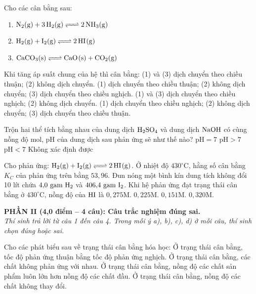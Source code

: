 \documentclass[12pt,a4paper]{article}
\begin{document}
\begin{ex}
Cho các cân bằng sau:
\begin{enumerate}[(1)]
	\item $\ce{N2(g) + 3H2(g) <=> 2NH3(g)}$
	\item $\ce{H2(g) + I2(g) <=> 2HI(g)}$
	\item $\ce{CaCO3(s) <=> CaO(s) + CO2(g)}$
\end{enumerate}
Khi tăng áp suất chung của hệ thì cân bằng:
\choice
{(1) và (3) dịch chuyển theo chiều thuận; (2) không dịch chuyển.}
{(1) dịch chuyển theo chiều thuận; (2) không dịch chuyển; (3) dịch chuyển theo chiều nghịch.}
{(1) và (3) dịch chuyển theo chiều nghịch; (2) không dịch chuyển.}
{(1) dịch chuyển theo chiều nghịch; (2) không dịch chuyển; (3) dịch chuyển theo chiều thuận.}
\loigiai{}
\end{ex}

\begin{ex}
Trộn hai thể tích bằng nhau của dung dịch $\ce{H2SO4}$ và dung dịch $\ce{NaOH}$ có cùng nồng độ mol, pH của dung dịch sau phản ứng sẽ như thế nào?
\choice
{$\text{pH} = 7$}
{$\text{pH} > 7$}
{$\text{pH} < 7$}
{Không xác định được}
\loigiai{}
\end{ex}

\begin{ex}
Cho phản ứng: $\ce{H2(g) + I2(g) <=> 2HI(g)}$. Ở nhiệt độ $430^\circ\text{C}$, hằng số cân bằng $K_C$ của phản ứng trên bằng $53{,}96$. Đun nóng một bình kín dung tích không đổi 10 lít chứa $4{,}0\text{ gam } \ce{H2}$ và $406{,}4\text{ gam } \ce{I2}$. Khi hệ phản ứng đạt trạng thái cân bằng ở $430^\circ\text{C}$, nồng độ của $\ce{HI}$ là
\choice
{$0{,}275\text{M}.$}
{$0{,}225\text{M}.$}
{$0{,}151\text{M}.$}
{$0{,}320\text{M}.$}
\loigiai{}
\end{ex}


\bigskip
\noindent
\textbf{PHẦN II (4,0 điểm -- 4 câu): Câu trắc nghiệm đúng sai.}\\
\textit{Thí sinh trả lời từ câu 1 đến câu 4. Trong mỗi ý a), b), c), d) ở mỗi câu, thí sinh chọn đúng hoặc sai.}

\begin{ex}
Cho các phát biểu sau về trạng thái cân bằng hóa học:
\choiceTF
{Ở trạng thái cân bằng, tốc độ phản ứng thuận bằng tốc độ phản ứng nghịch.}
{Ở trạng thái cân bằng, các chất không phản ứng với nhau.}
{Ở trạng thái cân bằng, nồng độ các chất sản phẩm luôn lớn hơn nồng độ các chất đầu.}
{Ở trạng thái cân bằng, nồng độ các chất không thay đổi.}
\loigiai{}
\end{ex}
\end{document}

